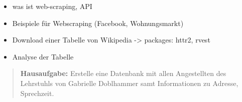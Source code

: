 \begin{itemize}
\tightlist
\item
  was ist web-scraping, API
\item
  Beispiele für Webscraping (Facebook, Wohnungsmarkt)
\item
  Download einer Tabelle von Wikipedia -\textgreater{} packages: httr2,
  rvest
\item
  Analyse der Tabelle
\end{itemize}

\begin{quote}
\textbf{Hausaufgabe:} Erstelle eine Datenbank mit allen Angestellten des
Lehrstuhls von Gabrielle Doblhammer samt Informationen zu Adresse,
Sprechzeit.
\end{quote}






\makeatletter
\def\@maketitle{%
  \newpage
  \let \footnote \thanks
    {\fontsize{18}{20}\selectfont\raggedright  \setlength{\parindent}{0pt} \@title \par}%
}
\makeatother